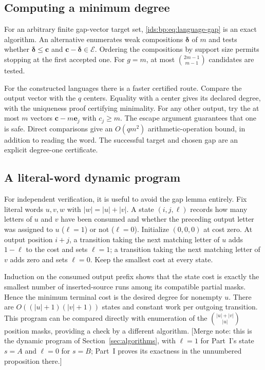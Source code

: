 \documentclass[11pt,letterpaper]{article}
\theoremstyle{definition}\newtheorem{definition}[theorem]{Definition}
\theoremstyle{remark}\newtheorem{remark}[theorem]{Remark}
\theoremstyle{definition}\newtheorem{question}[theorem]{Question}
\newcommand{\bpE}{\mathcal E}
\begin{document}
\subsection{Computing a minimum degree}
For an arbitrary finite gap-vector target set,
\eqref{ids:bp:eq:language-gap} is an exact algorithm. An alternative
enumerates weak compositions $\boldsymbol\delta$ of $m$ and tests whether
$\boldsymbol\delta\leq\mathbf c$ and
$\mathbf c-\boldsymbol\delta\in \bpE$. Ordering the compositions by support
size permits stopping at the first accepted one. For $g=m$, at most
$\binom{2m-1}{m-1}$ candidates are tested.

For the constructed languages there is a faster certified route. Compare the
output vector with the $q$ centers. Equality with a center gives its declared
degree, with the uniqueness proof certifying minimality. For any other output,
try the at most $m$ vectors $\mathbf c-m\mathbf e_j$ with $c_j\geq m$.
The escape argument guarantees that one is safe. Direct comparisons give an
$O(qm^2)$ arithmetic-operation bound, in addition to reading the word. The
successful target and chosen gap are an explicit degree-one certificate.

\subsection{A literal-word dynamic program}\label{ids:bp:sec:literal-dp}
For independent verification, it is useful to avoid the gap lemma entirely.
Fix literal words $u,v,w$ with $|w|=|u|+|v|$. A state $(i,j,\ell)$ records
how many letters of $u$ and $v$ have been consumed and whether the preceding
output letter was assigned to $u$ ($\ell=1$) or not ($\ell=0$). Initialize
$(0,0,0)$ at cost zero. At output position $i+j$, a transition taking the
next matching letter of $u$ adds $1-\ell$ to the cost and sets $\ell=1$;
a transition taking the next matching letter of $v$ adds zero and sets
$\ell=0$. Keep the smallest cost at every state.

Induction on the consumed output prefix shows that the state cost is exactly
the smallest number of inserted-source runs among its compatible partial
masks. Hence the minimum terminal cost is the desired degree for nonempty
$u$. There are $O((|u|+1)(|v|+1))$ states and constant work per outgoing
transition. This program can be compared directly with enumeration of the
$\binom{|u|+|v|}{|u|}$ position masks, providing a check by a different
algorithm. [Merge note: this is the dynamic program of
Section~\ref{sec:algorithms}, with $\ell=1$ for Part~I's state $s=A$ and
$\ell=0$ for $s=B$; Part~I proves its exactness in the unnumbered proposition
there.]
\end{document}
